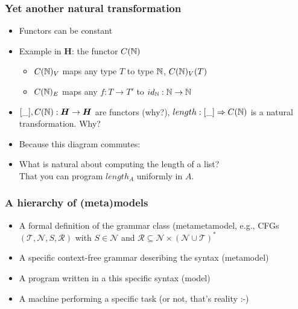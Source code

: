 \documentclass[handout]{beamer}
\newcommand{\To}{\Rightarrow}
\newcommand{\bfsf}[1]{{\boldsymbol{#1}}}
\newcommand{\HH}{\bfsf{H}}
\begin{document}
\frame
  {   
    \frametitle{Yet another natural transformation}\label{Ch3:length}

 \begin{itemize}[<+->]
\item Functors can be constant
\item Example in $\HH$: the functor $C(\mathbb{N})$ 
   \begin{itemize}[<+->]
\item $C(\mathbb{N})_V$ maps any type $T$ to type $\mathbb{N}$, $C(\mathbb{N})_V(T)$
\item $C(\mathbb{N})_E$ maps any $f: T\to T'$ to $id_{\mathbb{N}}: \mathbb{N}\to\mathbb{N}$
   \end{itemize}
\item $[\_],C(\nat):\HH\to\HH$ are functors (why?), $length: [\_] \To C(\nat)$ 
is a natural transformation. Why? \vspace*{-0.5cm}
\item Because this diagram commutes:
\item What is natural about computing the length of a list?\\
That you can program $length_A$ uniformly in $A$.
 \end{itemize}

 }

\frame
  {   
    \frametitle{A hierarchy of (meta)models}\label{Ch3:metameta}

 \begin{itemize}[<+->]
\item A formal definition of the grammar class (metametamodel, e.g., CFGs
$(\mathcal T, \mathcal N, S, \mathcal R)$ with $S\in\mathcal N$ and
$\mathcal R \subseteq\mathcal N \times (\mathcal N \cup\mathcal T)^*$
\item A specific context-free grammar describing the syntax (metamodel)
\item A program written in a this specific syntax (model)
\item A machine performing a specific task (or not, that's reality :-)
 \end{itemize}

 }
\end{document}
